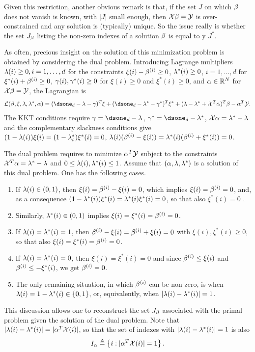 Given this restriction, another obvious remark is that, if the set $J$ on which $\beta$ does not
vanish is known, with $|J|$ small enough, then ${\mathcal X}\beta = {\mathcal Y}$ is
over-constrained and any solution is (typically) unique. So the issue really is
whether the set $J_\beta$ listing the non-zero indexes of a solution $\beta$ is equal to y $J^*$. 

As often, precious insight on the solution of this minimization problem  is obtained by considering the dual problem. Introducing
Lagrange multipliers $\lambda(i)\geq 0, i=1, \ldots, d$ for the constraints $\xi(i) - \beta^{(i)}  \geq 0$,   $\lambda^*(i)\geq 0$, $i=1, \ldots, d$ for $\xi^*(i) + \beta^{(i)}  \geq 0$, $\gamma(i), \gamma^*(i)\geq 0 $ for $\xi(i) \geq 0$ and $\xi^*(i) \geq 0$,  and $\alpha\in {\mathbb{R}}^N$ for ${\mathcal X} \beta = {\mathcal Y}$, the Lagrangian is
\[
\CL(\be, \xi, \la, \la^*, \al) = (\dsone_d - \la - \ga)^T\xi + (\dsone_d - \la^* - \ga^*)^T\xi^* + (\la-\la^* + \CX^T\al)^T\be - \al^T\CY.
\]
The KKT conditions require $\ga = \dsone_d - \la$, $\ga^* = \dsone_d - \la^*$, ${\mathcal X}\alpha = \lambda^* - \lambda$ and the complementary slackness conditions
give $(1-\lambda(i))\xi(i) = (1-\lambda^*_i)\xi^*(i) = 0$, $\lambda(i)(\beta^{(i)} - \xi(i)) = \lambda^*(i)(\beta^{(i)}  + \xi^*(i)) = 0$. 

The dual problem requires to minimize $\alpha^T{\mathcal Y}$ subject to the constraints ${\mathcal X}^T\alpha = \lambda^* - \lambda$ and $0\leq \lambda(i), \lambda^*(i) \leq 1$.
Assume that $(\alpha, \lambda, \lambda^*)$ is a solution of this dual problem. One has the following cases.
\begin{enumerate}[label = (\arabic*)]
\item If $\lambda(i)\in (0,1)$, then $\xi(i) = \beta^{(i)} - \xi(i) = 0$, which implies $\xi(i) = \beta^{(i)} = 0$, and, as a consequence $(1-\lambda^*(i))\xi^*(i) = \lambda^*(i)\xi^*(i) = 0$, so that also $\xi^*(i)=0$ . 
\item Similarly, $\lambda^*(i) \in (0,1)$ implies $\xi(i) = \xi^*(i) = \beta^{(i)} = 0$. 
\item If $\lambda(i)= \lambda^*(i) = 1$, then $\beta^{(i)}  - \xi(i) = \beta^{(i)} + \xi(i) =0$ with $\xi(i), \xi^*(i) \geq 0$, so that also $\xi(i) = \xi^*(i) = \beta^{(i)} = 0$. 
\item If $\lambda(i)= \lambda^*(i) = 0$, then $\xi(i) = \xi^*(i) = 0$ and since $\beta^{(i)} \leq \xi(i)$ and $\beta^{(i)} \leq - \xi^*(i)$, we get $\beta^{(i)} = 0$.
\item The only remaining situation, in which $\beta^{(i)} $ can be non-zero, is when $\lambda(i) = 1-\lambda^*(i) \in \{0,1\}$, or, equivalently, when $|\lambda(i) - \lambda^*(i)|=1$.  
\end{enumerate}
This discussion allows one to reconstruct the set $J_\beta$ associated with the primal problem given the solution of the dual problem. Note that $|\lambda(i) - \lambda^*(i)| = |\alpha^T{\mathcal X}(i)|$, so that the set of indexes with  $|\lambda(i) - \lambda^*(i)|=1$ is also
\[
I_\alpha \stackrel{{\scriptscriptstyle \Delta}}{=} \left\{ i: |\alpha^T{\mathcal X}(i)| = 1 \right\}.
\]

